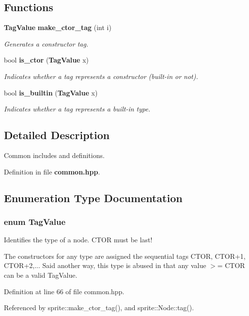 \subsection*{Functions}
\begin{CompactItemize}
\item 
{\bf Tag\-Value} {\bf make\_\-ctor\_\-tag} (int i)\label{namespacesprite_a45}

\begin{CompactList}\small\item\em Generates a constructor tag. \item\end{CompactList}\item 
bool {\bf is\_\-ctor} ({\bf Tag\-Value} x)\label{namespacesprite_a46}

\begin{CompactList}\small\item\em Indicates whether a tag represents a constructor (built-in or not). \item\end{CompactList}\item 
bool {\bf is\_\-builtin} ({\bf Tag\-Value} x)\label{namespacesprite_a47}

\begin{CompactList}\small\item\em Indicates whether a tag represents a built-in type. \item\end{CompactList}\end{CompactItemize}


\subsection{Detailed Description}
Common includes and definitions. 



Definition in file {\bf common.hpp}.

\subsection{Enumeration Type Documentation}
\subsubsection{\setlength{\rightskip}{0pt plus 5cm}enum {\bf Tag\-Value}}\label{namespacesprite_file_a72}


Identifies the type of a node. CTOR must be last! 

The constructors for any type are assigned the sequential tags CTOR, CTOR+1, CTOR+2,... Said another way, this type is abused in that any value $>$= CTOR can be a valid Tag\-Value. 

Definition at line 66 of file common.hpp.

Referenced by sprite::make\_\-ctor\_\-tag(), and sprite::Node::tag().